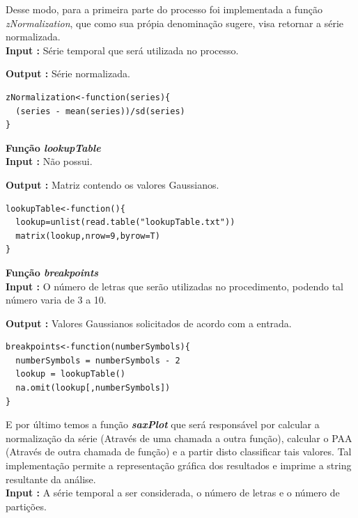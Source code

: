 \documentclass[12pt,letterpaper]{article}
\begin{document}
Desse modo, para a primeira parte do processo foi implementada  a função \textit{zNormalization}, que como sua própia denominação sugere, visa retornar a série normalizada.\\

\textbf{Input :} Série temporal que será utilizada no processo.

\textbf{Output :} Série normalizada.\\

\begin{lstlisting}
zNormalization<-function(series){
  (series - mean(series))/sd(series)
}
\end{lstlisting}

\textbf{Função \textit{lookupTable}}\\

\textbf{Input :} Não possui.

\textbf{Output :} Matriz contendo os valores Gaussianos.\\

\begin{lstlisting}
lookupTable<-function(){
  lookup=unlist(read.table("lookupTable.txt"))
  matrix(lookup,nrow=9,byrow=T)
}
\end{lstlisting}

\textbf{Função \textit{breakpoints}}\\

\textbf{Input :} O número de letras que serão utilizadas no procedimento, podendo tal número varia de 3 a 10.

\textbf{Output :} Valores Gaussianos solicitados de acordo com a entrada.\\

\begin{lstlisting}
breakpoints<-function(numberSymbols){
  numberSymbols = numberSymbols - 2
  lookup = lookupTable()
  na.omit(lookup[,numberSymbols])
}
\end{lstlisting}

E por último temos a função \textit{\textbf{saxPlot}} que será responsável por calcular a normalização da série (Através de uma chamada a outra função), calcular o PAA (Através de outra chamada de função) e a partir disto classificar tais valores. Tal implementação permite a representação gráfica dos resultados e imprime a string resultante da análise.\\

\textbf{Input :} A série temporal a ser considerada, o número de letras e o número de partições.
\end{document}
